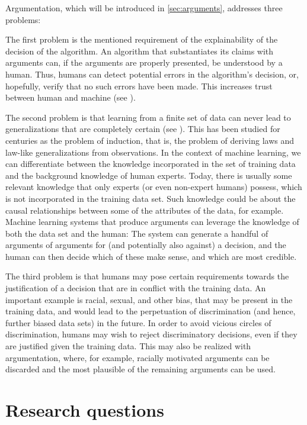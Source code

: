Argumentation, which will be introduced in \autoref{sec:arguments}, addresses three problems:

The first problem is the mentioned requirement of the explainability of the decision of the algorithm. An algorithm that substantiates its claims with arguments can, if the arguments are properly presented, be understood by a human. Thus, humans can detect potential errors in the algorithm’s decision, or, hopefully, verify that no such errors have been made. This increases trust between human and machine (see \citet{doshi-velezAccountabilityAILaw2019}).

The second problem is that learning from a finite set of data can never lead to generalizations that are completely certain (see \citet{kakasAbductionArgumentationExplainable2020}). This has been studied for centuries as the problem of induction, that is, the problem of deriving laws and law-like generalizations from observations. In the context of machine learning, we can differentiate between the knowledge incorporated in the set of training data and the background knowledge of human experts. Today, there is usually some relevant knowledge that only experts (or even non-expert humans) possess, which is not incorporated in the training data set. Such knowledge could be about the causal relationships between some of the attributes of the data, for example. Machine learning systems that produce arguments can leverage the knowledge of both the data set and the human: The system can generate a handful of arguments of arguments for (and potentially also against) a decision, and the human can then decide which of these make sense, and which are most credible.

The third problem is that humans may pose certain requirements towards the justification of a decision that are in conflict with the training data. An important example is racial, sexual, and other bias, that may be present in the training data, and would lead to the perpetuation of discrimination (and hence, further biased data sets) in the future. In order to avoid vicious circles of discrimination, humans may wish to reject discriminatory decisions, even if they are justified given the training data. This may also be realized with argumentation, where, for example, racially motivated arguments can be discarded and the most plausible of the remaining arguments can be used.

\section{Research questions}

